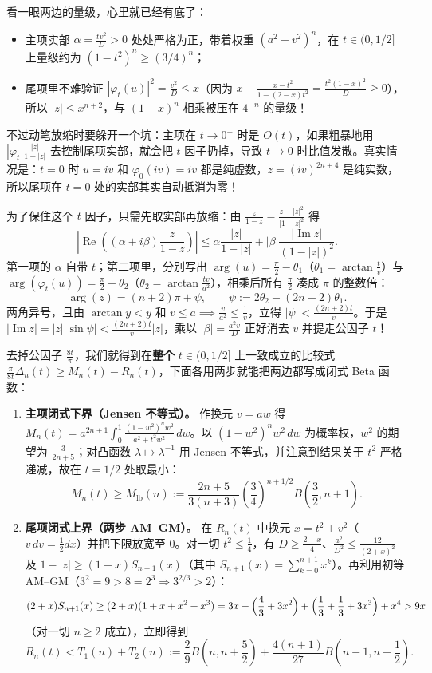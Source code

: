 \documentclass[UTF8,fontset=windows,a4paper,11pt]{ctexart}
\newcommand{\RePart}{\operatorname{Re}}
\newcommand{\ImPart}{\operatorname{Im}}
\begin{document}
看一眼两边的量级，心里就已经有底了：
\begin{itemize}
    \item 主项实部 $\alpha=\frac{tv^2}{D}>0$ 处处严格为正，带着权重 $(a^2-v^2)^n$，在 $t\in(0,1/2]$ 上量级约为 $(1-t^2)^n\ge(3/4)^n$；
    \item 尾项里不难验证 $|\varphi_t(u)|^2=\frac{v^2}{D}\le x$（因为 $x-\frac{x-t^2}{1-(2-x)t^2}=\frac{t^2(1-x)^2}{D}\ge 0$），所以 $|z|\le x^{n+2}$，与 $(1-x)^n$ 相乘被压在 $4^{-n}$ 的量级！
\end{itemize}

不过动笔放缩时要躲开一个坑：主项在 $t\to 0^+$ 时是 $O(t)$，如果粗暴地用 $|\varphi_t|\frac{|z|}{1-|z|}$ 去控制尾项实部，就会把 $t$ 因子扔掉，导致 $t\to 0$ 时比值发散。真实情况是：$t=0$ 时 $u=iv$ 和 $\varphi_0(iv)=iv$ 都是纯虚数，$z=(iv)^{2n+4}$ 是纯实数，所以尾项在 $t=0$ 处的实部其实自动抵消为零！

为了保住这个 $t$ 因子，只需先取实部再放缩：由 $\frac{z}{1-z}=\frac{z-|z|^2}{|1-z|^2}$ 得
\[
    \left|\RePart\!\left((\alpha+i\beta)\frac{z}{1-z}\right)\right|
    \le \alpha\frac{|z|}{1-|z|} + |\beta|\frac{|\ImPart z|}{(1-|z|)^2}.
\]
第一项的 $\alpha$ 自带 $t$；第二项里，分别写出 $\arg(u)=\frac\pi2-\theta_1$（$\theta_1=\arctan\frac{t}{v}$）与 $\arg(\varphi_t(u))=\frac\pi2+\theta_2$（$\theta_2=\arctan\frac{tv}{a^2}$），相乘后所有 $\frac\pi2$ 凑成 $\pi$ 的整数倍：
\[
    \arg(z) = (n+2)\pi + \psi,
    \qquad
    \psi := 2\theta_2-(2n+2)\theta_1.
\]
两角异号，且由 $\arctan y<y$ 和 $v\le a\implies \frac{v}{a^2}\le\frac{1}{v}$，立得 $|\psi|<\frac{(2n+2)t}{v}$。于是 $|\ImPart z|=|z||\sin\psi|<\frac{(2n+2)t}{v}|z|$，乘以 $|\beta|=\frac{a^2v}{D}$ 正好消去 $v$ 并提走公因子 $t$！

去掉公因子 $\frac{8t}{\pi}$，我们就得到在\textbf{整个} $t\in(0,1/2]$ 上一致成立的比较式 $\frac{\pi}{8t}\Delta_n(t)\ge M_n(t)-R_n(t)$，下面各用两步就能把两边都写成闭式 Beta 函数：

\begin{enumerate}
    \item \textbf{主项闭式下界（Jensen 不等式）。} 作换元 $v=aw$ 得 $M_n(t)=a^{2n+1}\int_0^1\frac{(1-w^2)^n w^2}{a^2+t^2w^2}\,dw$。以 $(1-w^2)^n w^2\,dw$ 为概率权，$w^2$ 的期望为 $\frac{3}{2n+5}$；对凸函数 $\lambda\mapsto\lambda^{-1}$ 用 Jensen 不等式，并注意到结果关于 $t^2$ 严格递减，故在 $t=1/2$ 处取最小：
    \[
        M_n(t) \ge M_{\mathrm{lb}}(n)
        := \frac{2n+5}{3(n+3)}\left(\frac34\right)^{n+1/2}B\!\left(\frac32,n+1\right).
    \]
    \item \textbf{尾项闭式上界（两步 AM--GM）。} 在 $R_n(t)$ 中换元 $x=t^2+v^2$（$v\,dv=\frac12 dx$）并把下限放宽至 $0$。对一切 $t^2\le\frac14$，有 $D\ge\frac{2+x}{4}$、$\frac{a^2}{D^2}\le\frac{12}{(2+x)^2}$ 及 $1-|z|\ge(1-x)S_{n+1}(x)$（其中 $S_{n+1}(x)=\sum_{k=0}^{n+1}x^k$）。再利用初等 AM--GM（$3^2=9>8=2^3\Rightarrow 3^{2/3}>2$）：
    \[
        (2+x)S_{n+1}(x) \ge (2+x)(1+x+x^2+x^3)
        = 3x+\Bigl(\frac43+3x^2\Bigr)+\Bigl(\frac13+\frac13+3x^3\Bigr)+x^4 > 9x
    \]
    （对一切 $n\ge 2$ 成立），立即得到
    \[
        R_n(t) < T_1(n)+T_2(n)
        := \frac29 B\!\left(n,n+\frac52\right)
         + \frac{4(n+1)}{27}B\!\left(n-1,n+\frac12\right).
    \]
\end{enumerate}
\end{document}
